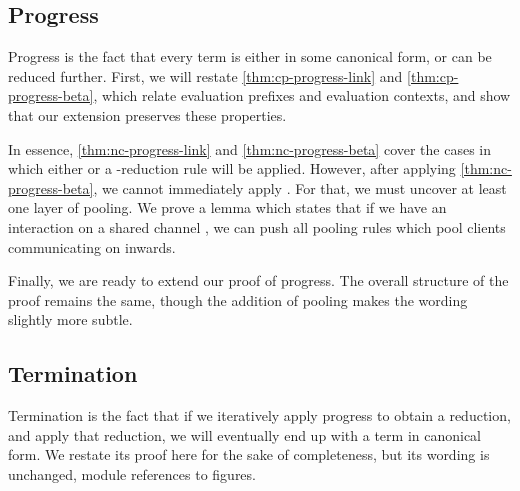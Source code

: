\subsection{Progress}
Progress is the fact that every term is either in some canonical form, or can be
reduced further.
First, we will restate \cref{thm:cp-progress-link} and \cref{thm:cp-progress-beta},
which relate evaluation prefixes and evaluation contexts, and show that our
extension preserves these properties. 


In essence, \cref{thm:nc-progress-link} and \cref{thm:nc-progress-beta} cover
the cases in which either  or a \textbeta-reduction rule will be
applied.
However, after applying \cref{thm:nc-progress-beta}, we cannot immediately apply
. For that, we must uncover at least one layer of pooling.
We prove a lemma which states that if we have an interaction on a shared channel
, we can push all pooling rules which pool clients communicating on 
inwards. 

Finally, we are ready to extend our proof of progress. The overall structure of
the proof remains the same, though the addition of pooling makes the wording
slightly more subtle.


\subsection{Termination}
Termination is the fact that if we iteratively apply progress to obtain a
reduction, and apply that reduction, we will eventually end up with a term in
canonical form.
We restate its proof here for the sake of completeness, but its wording is
unchanged, module references to figures.


